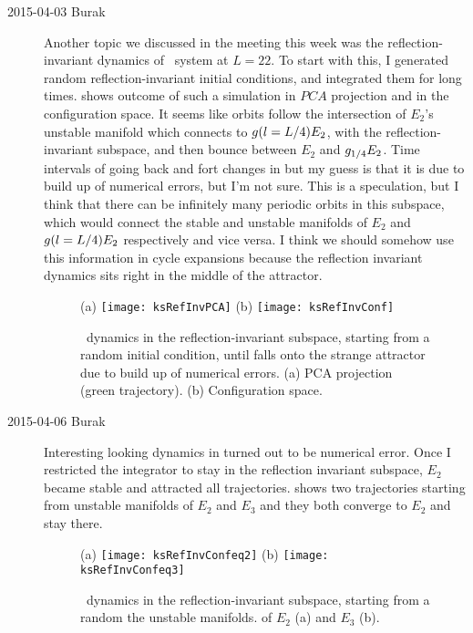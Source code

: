 \begin{description}
\item[2015-04-03 Burak] Another topic we discussed in the meeting
this week was the reflection-invariant dynamics of \KS\ system
at $L=22$. To start with this, I generated random
reflection-invariant initial conditions, and integrated them for
long times.  shows outcome of such a simulation
in $PCA$ projection and in the configuration space. It seems like
orbits follow the intersection of $E_2$'s unstable manifold
which connects to $g (l = L/4) E_2$, with the reflection-invariant
subspace, and then bounce between $E_2$ and $g_{1/4} E_2$.
Time intervals of going back and fort changes in
 but my guess is that it is due to build up of
numerical errors, but I'm not sure. This is a speculation, but
I think that there can be infinitely many periodic orbits in this
subspace, which would connect the stable and unstable manifolds of
$E_2$ and $g (l = L/4) E_2$ respectively and vice versa. I think
we should somehow use this information in cycle expansions because
the reflection invariant dynamics sits right in the middle of the
attractor.

\begin{figure}[ht]
\begin{center}
    (a) \texttt{[image: ksRefInvPCA]}
    (b) \texttt{[image: ksRefInvConf]}
\end{center}
    \caption[]{
        \KS\ dynamics in the reflection-invariant subspace,
        starting from a random initial condition, until falls
        onto the strange attractor due to build up of
        numerical errors.
        (a) PCA projection (green trajectory).
        (b) Configuration space.
    }
    \label{f-RefInv}
\end{figure}

\item[2015-04-06 Burak] Interesting looking dynamics in
 turned out to be numerical error. Once I restricted
the integrator to stay in the reflection invariant subspace, $E_2$
became stable and attracted all trajectories. 
shows two trajectories starting from unstable manifolds of $E_2$ and
$E_3$ and they both converge to $E_2$ and stay there.

\begin{figure}[ht]
\begin{center}
    (a) \texttt{[image: ksRefInvConfeq2]}
    (b) \texttt{[image: ksRefInvConfeq3]}
\end{center}
    \caption[]{
        \KS\ dynamics in the reflection-invariant subspace,
        starting from a random the unstable manifolds. of $E_2$ (a)
        and $E_3$ (b).
    }
    \label{f-RefInvConf}
\end{figure}


\end{description}
